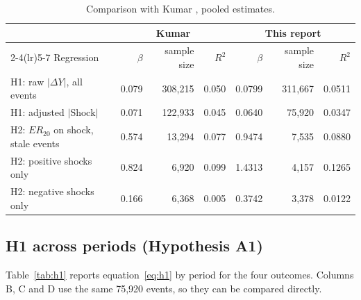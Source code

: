 \documentclass[a4paper,11pt]{article}
\begin{document}
\begin{table}[htbp]
\centering
\caption{Comparison with Kumar \cite{kumar2026delayed}, pooled estimates.}
\label{tab:replication}
\footnotesize
\begin{tabular}{p{5.2cm}rrrrrr}
\toprule
 & \multicolumn{3}{c}{Kumar \cite{kumar2026delayed}} & \multicolumn{3}{c}{This report} \\
\cmidrule(lr){2-4}\cmidrule(lr){5-7}
Regression & $\beta$ & sample size & $R^2$ & $\beta$ & sample size & $R^2$ \\
\midrule
H1: raw $|\Delta Y|$, all events        & 0.079 & 308,215 & 0.050 & 0.0799 & 311,667 & 0.0511 \\
H1: adjusted $|\text{Shock}|$           & 0.071 & 122,933 & 0.045 & 0.0640 & 75,920  & 0.0347 \\
H2: $ER_{20}$ on shock, stale events    & 0.574 & 13,294  & 0.077 & 0.9474 & 7,535   & 0.0880 \\
H2: positive shocks only                & 0.824 & 6,920   & 0.099 & 1.4313 & 4,157   & 0.1265 \\
H2: negative shocks only                & 0.166 & 6,368   & 0.005 & 0.3742 & 3,378   & 0.0122 \\
\bottomrule
\end{tabular}
\end{table}

\subsection{H1 across periods (Hypothesis A1)}
Table~\ref{tab:h1} reports equation~\eqref{eq:h1} by period for the four outcomes. Columns B, C and D use the same 75,920 events, so they can be compared directly.
\end{document}
